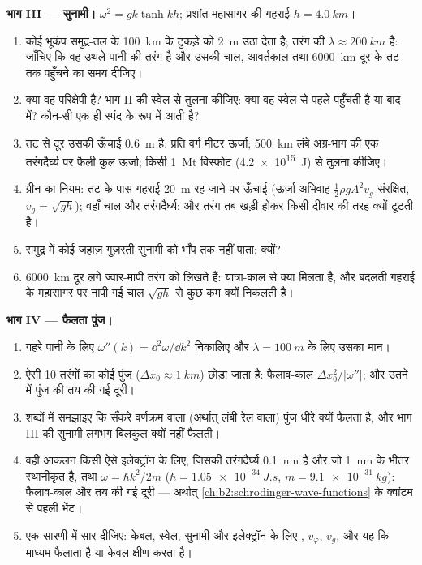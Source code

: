 \begin{problem}[{सप्ताहांत समस्या --- परिक्षेपण काम पर: वह तार-केबल
जिसने बिंदुओं को लीप दिया, वह स्वेल जो तूफ़ान की सूचना देती है, वह
सुनामी जो पूरा महासागर पार कर जाती है, और वह पुंज जो फैलता है}]
\medskip
\noindent\textbf{भाग III --- सुनामी।}
$\omega^2 = gk\tanh kh$; प्रशांत महासागर की गहराई $h = \qty{4.0}{km}$।
\begin{enumerate}[resume]
  \item कोई भूकंप समुद्र-तल के \qty{100}{km} के टुकड़े को \qty{2}{m} उठा देता है;
        तरंग की $\lambda \approx \qty{200}{km}$ है: जाँचिए कि वह उथले पानी की
        तरंग है और उसकी चाल, आवर्तकाल तथा \qty{6000}{km} दूर के
        तट तक पहुँचने का समय दीजिए।
  \item क्या वह परिक्षेपी है? भाग II की स्वेल से तुलना कीजिए: क्या वह
        स्वेल से पहले पहुँचती है या बाद में? कौन-सी एक ही
        स्पंद के रूप में आती है?
  \item तट से दूर उसकी ऊँचाई \qty{0.6}{m} है: प्रति वर्ग मीटर ऊर्जा;
        \qty{500}{km} लंबे अग्र-भाग की एक तरंगदैर्घ्य पर फैली कुल
        ऊर्जा; किसी \qty{1}{Mt} विस्फोट (\qty{4.2e15}{J}) से तुलना कीजिए।
  \item ग्रीन का नियम: तट के पास गहराई \qty{20}{m} रह जाने पर ऊँचाई
        (ऊर्जा-अभिवाह $\tfrac12\rho gA^2v_g$ संरक्षित, $v_g = \sqrt{gh}$);
        वहाँ चाल और तरंगदैर्घ्य; और तरंग तब खड़ी होकर किसी दीवार की तरह
        क्यों टूटती है।
  \item समुद्र में कोई जहाज़ गुज़रती सुनामी को भाँप तक नहीं पाता: क्यों?
  \item \qty{6000}{km} दूर लगे ज्वार-मापी तरंग को लिखते हैं: यात्रा-काल से
        क्या मिलता है, और बदलती गहराई के महासागर पर नापी गई चाल
        $\sqrt{gh}$ से कुछ कम क्यों निकलती है।
\end{enumerate}

\medskip
\noindent\textbf{भाग IV --- फैलता पुंज।}
\begin{enumerate}[resume]
  \item गहरे पानी के लिए $\omega''(k) = \dd^2\omega/\dd k^2$ निकालिए और
        $\lambda = \qty{100}{m}$ के लिए उसका मान।
  \item ऐसी \qty{10}{} तरंगों का कोई पुंज ($\Delta x_0 \approx \qty{1}{km}$)
        छोड़ा जाता है: फैलाव-काल $\Delta x_0^2/|\omega''|$; और उतने में पुंज की
        तय की गई दूरी।
  \item शब्दों में समझाइए कि सँकरे वर्णक्रम वाला (अर्थात् लंबी रेल वाला)
        पुंज धीरे क्यों फैलता है, और भाग III की सुनामी
        लगभग बिलकुल क्यों नहीं फैलती।
  \item वही आकलन किसी ऐसे इलेक्ट्रॉन के लिए, जिसकी तरंगदैर्घ्य \qty{0.1}{nm} है
        और जो \qty{1}{nm} के भीतर स्थानीकृत है, तथा $\omega = \hbar k^2/2m$ ($\hbar =
        \qty{1.05e-34}{J.s}$, $m = \qty{9.1e-31}{kg}$): फैलाव-काल और
        तय की गई दूरी --- अर्थात् \cref{ch:b2:schrodinger-wave-functions} के
        क्वांटम  से पहली भेंट।
  \item एक सारणी में सार दीजिए: केबल, स्वेल, सुनामी और
        इलेक्ट्रॉन के लिए , $v_\varphi$, $v_g$, और
        यह कि माध्यम फैलाता है या केवल क्षीण करता है।
\end{enumerate}
\end{problem}
